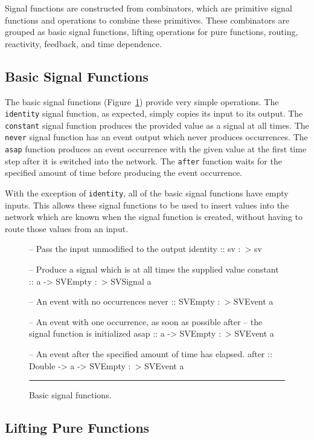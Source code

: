 Signal functions are constructed from combinators, which are primitive signal
functions and operations to combine these primitives. These combinators are
grouped as basic signal functions, lifting operations for pure functions,
routing, reactivity, feedback, and time dependence.

\subsection{Basic Signal Functions}
\label{subsection:System_Design_and_Interface-Combinators-Basic_Signal_Functions}

The basic signal functions (Figure~\ref{figure:basic_signal_functions})
provide very simple operations. The {\tt identity} signal function, as expected,
simply copies its input to its output. The {\tt constant} signal function
produces the provided value as a signal at all times. The {\tt never} signal
function has an event output which never produces occurrences. The {\tt asap}
function produces an event occurrence with the given value at the first time
step after it is switched into the network. The {\tt after} function waits for
the specified amount of time before producing the event occurrence.

With the exception of {\tt identity}, all of the basic signal functions have
empty inputs. This allows these signal functions to be used to insert values
into the network which are known when the signal function is created, without
having to route those values from an input.

\begin{figure}
\begin{code}
-- Pass the input unmodified to the output
identity :: sv :~> sv

-- Produce a signal which is at all times the supplied value
constant :: a -> SVEmpty :~> SVSignal a

-- An event with no occurrences
never    :: SVEmpty :~> SVEvent a

-- An event with one occurrence, as soon as possible after
-- the signal function is initialized
asap     :: a -> SVEmpty :~> SVEvent a

-- An event after the specified amount of time has elapsed.
after    :: Double -> a -> SVEmpty :~> SVEvent a
\end{code}
\hrule
\caption{Basic signal functions.}
\label{figure:basic_signal_functions}
\end{figure}

\subsection{Lifting Pure Functions}
\label{subsection:System_Design_and_Interface-Combinators-Lifting_Pure_Functions}

